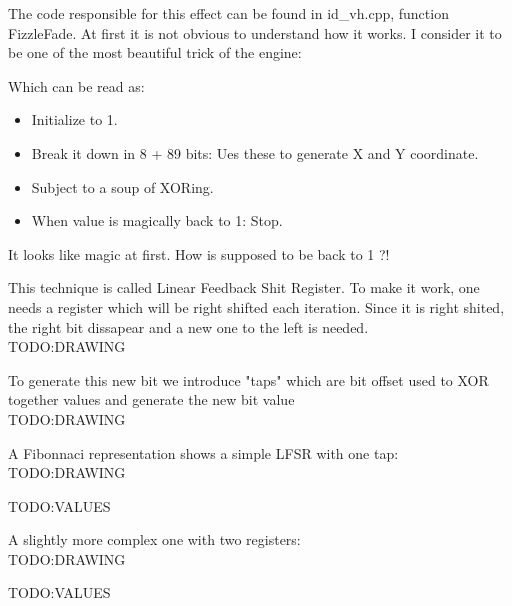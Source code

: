 The code responsible for this effect can be found in id\_vh.cpp, function FizzleFade. At first it is not obvious to understand how it works. I consider it to be one of the most beautiful trick of the engine:\\
\par
\begin{minipage}{\textwidth}

\end{minipage}
\par
Which can be read as:\\
\begin{itemize}
\item Initialize  to 1.
\item Break it down in 8 + 89 bits: Ues these to generate X and Y coordinate.
\item Subject  to a soup of XORing.
\item When  value is magically back to 1: Stop.
\end{itemize}        
It looks like magic at first. How is  supposed to be back to 1 ?!\\
\par
This technique is called Linear Feedback Shit Register. To make it work, one needs a register which will be right shifted each iteration. Since it is right shited, the right bit dissapear and a new one to the left is needed.\\
TODO:DRAWING\\
\par
To generate this new bit we introduce "taps" which are bit offset used to XOR together values and generate the new bit value\\
TODO:DRAWING\\
\par
A Fibonnaci representation shows a simple LFSR with one tap:\\
TODO:DRAWING\\
\par
TODO:VALUES\\
\par
A slightly more complex one with two registers:\\
TODO:DRAWING\\
\par
TODO:VALUES\\
\par



